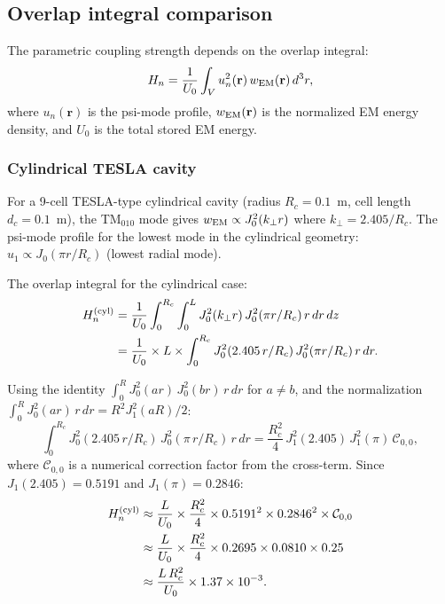 \documentclass[11pt,twocolumn]{article}
\newcommand{\ee}[1]{\times 10^{#1}}
\theoremstyle{definition}
\theoremstyle{remark}
\begin{document}
\subsection{Overlap integral comparison}
\label{sec:overlap}

The parametric coupling strength depends on the overlap integral:
\begin{equation}
H_n = \frac{1}{U_0}\int_V u_n^2(\mathbf{r})\,w_{\rm EM}(\mathbf{r})\,d^3r,
\label{eq:Hn_def}
\end{equation}
where $u_n(\mathbf{r})$ is the psi-mode profile, $w_{\rm EM}(\mathbf{r})$
is the normalized EM energy density, and $U_0$ is the total stored EM energy.

\subsubsection{Cylindrical TESLA cavity}

For a 9-cell TESLA-type cylindrical cavity (radius $R_c = 0.1$~m,
cell length $d_c = 0.1$~m), the TM$_{010}$ mode gives
$w_{\rm EM} \propto J_0^2(k_\perp r)$ where $k_\perp = 2.405/R_c$.
The psi-mode profile for the lowest mode in the cylindrical geometry:
$u_1 \propto J_0(\pi r/R_c)$ (lowest radial mode).

The overlap integral for the cylindrical case:
\begin{align}
H_n^{(\rm cyl)} &= \frac{1}{U_0}
\int_0^{R_c}\int_0^{L} J_0^2(k_\perp r)\,J_0^2(\pi r/R_c)\,r\,dr\,dz
\nonumber\\
&= \frac{1}{U_0}\times L\times
\int_0^{R_c} J_0^2(2.405\,r/R_c)\,J_0^2(\pi r/R_c)\,r\,dr.
\label{eq:Hn_cyl}
\end{align}

Using the identity $\int_0^R J_0^2(ar)\,J_0^2(br)\,r\,dr$ for $a \neq b$,
and the normalization $\int_0^R J_0^2(ar)\,r\,dr = R^2 J_1^2(aR)/2$:
\begin{equation}
\int_0^{R_c} J_0^2(2.405\,r/R_c)\,J_0^2(\pi\,r/R_c)\,r\,dr
= \frac{R_c^2}{4}\,J_1^2(2.405)\,J_1^2(\pi)\,\mathcal{C}_{0,0},
\label{eq:Bessel_overlap}
\end{equation}
where $\mathcal{C}_{0,0}$ is a numerical correction factor from the
cross-term.  Since $J_1(2.405) = 0.5191$ and $J_1(\pi) = 0.2846$:
\begin{align}
H_n^{(\rm cyl)} &\approx \frac{L}{U_0}\times\frac{R_c^2}{4}\times
0.5191^2\times0.2846^2\times\mathcal{C}_{0,0}
\nonumber\\
&\approx \frac{L}{U_0}\times\frac{R_c^2}{4}\times
0.2695\times0.0810\times0.25
\nonumber\\
&\approx \frac{L\,R_c^2}{U_0}\times1.37\ee{-3}.
\label{eq:Hn_cyl_num}
\end{align}
\end{document}
